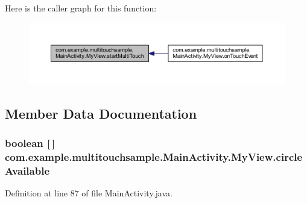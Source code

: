 Here is the caller graph for this function\+:
\nopagebreak
\begin{figure}[H]
\begin{center}
\leavevmode
\includegraphics[width=350pt]{classcom_1_1example_1_1multitouchsample_1_1_main_activity_1_1_my_view_a98da479657a7dabe6b6dee15e39b5a98_icgraph}
\end{center}
\end{figure}




\subsection{Member Data Documentation}
\hypertarget{classcom_1_1example_1_1multitouchsample_1_1_main_activity_1_1_my_view_a5df7070a08705a7a8d8aa00a906fa767}{}
\subsubsection[{circle\+Available}]{\setlength{\rightskip}{0pt plus 5cm}boolean \mbox{[}$\,$\mbox{]} com.\+example.\+multitouchsample.\+Main\+Activity.\+My\+View.\+circle\+Available\hspace{0.3cm}{\ttfamily [private]}}\label{classcom_1_1example_1_1multitouchsample_1_1_main_activity_1_1_my_view_a5df7070a08705a7a8d8aa00a906fa767}


Definition at line 87 of file Main\+Activity.\+java.

\hypertarget{classcom_1_1example_1_1multitouchsample_1_1_main_activity_1_1_my_view_a3bbc2d3fe569814080fe27c6c64eca77}{}
